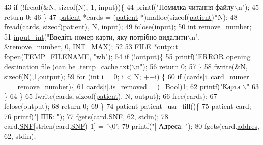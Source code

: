 \begin{DoxyCodeInclude}
{{{43     \textcolor{keywordflow}{if} (!fread(&N, \textcolor{keyword}{sizeof}(N), 1, input))\{
44         printf(\textcolor{stringliteral}{"Помилка читання файлу\(\backslash\)n"});
45         \textcolor{keywordflow}{return} 0;
46     \}
47     \hyperlink{structpatient__struct}{patient} *cards = (\hyperlink{structpatient__struct}{patient} *)malloc(\textcolor{keyword}{sizeof}(\hyperlink{structpatient__struct}{patient})*N);
48     fread(cards, \textcolor{keyword}{sizeof}(\hyperlink{structpatient__struct}{patient}), N, input);
49     fclose(input);
50     \textcolor{keywordtype}{int} remove\_number;
51     \hyperlink{lab__functions_8h_a6f453bc035d85e967bd5032eca31a155}{input\_int}(\textcolor{stringliteral}{"Введіть номер карти, яку потрібно видалити\(\backslash\)n"}, &remove\_number, 0, INT\_MAX);
52 
53     FILE *output = fopen(TEMP\_FILENAME, \textcolor{stringliteral}{"wb"});
54     \textcolor{keywordflow}{if} (!output)\{
55         printf(\textcolor{stringliteral}{"ERROR opening destination file (can be .temp\_cache.txt)\(\backslash\)n"});
56         \textcolor{keywordflow}{return} 0;
57     \}
58     fwrite(&N, \textcolor{keyword}{sizeof}(N),1,output);
59     \textcolor{keywordflow}{for} (\textcolor{keywordtype}{int} i = 0; i < N; ++i) \{
60         \textcolor{keywordflow}{if} (cards[i].\hyperlink{structpatient__struct_a06e0e04046e9434904f4e53bb8583332}{card\_numer} == remove\_number)\{
61             cards[i].\hyperlink{structpatient__struct_ad2475b69abfa9243c2700d63b63aa79b}{is\_removed} = (\_Bool)1;
62             printf(\textcolor{stringliteral}{"Карта \(\backslash\)"%
63         \}
64     \}
65     fwrite(cards, \textcolor{keyword}{sizeof}(\hyperlink{structpatient__struct}{patient}), N, output);
66     free(cards);
67     fclose(output);
68     \textcolor{keywordflow}{return} 0;
69 \}
74 \hyperlink{structpatient__struct}{patient} \hyperlink{main_8c_a582ffa97511f52032c2d36314db2a774}{patient\_usr\_fill}()\{
75     \hyperlink{structpatient__struct}{patient} card;
76     printf(\textcolor{stringliteral}{"|        ПІБ: "});
77     fgets(card.\hyperlink{structpatient__struct_a1748953b20361f0e24b467da0ef4a41c}{SNF}, 62, stdin);
78     card.\hyperlink{structpatient__struct_a1748953b20361f0e24b467da0ef4a41c}{SNF}[strlen(card.\hyperlink{structpatient__struct_a1748953b20361f0e24b467da0ef4a41c}{SNF})-1] = \textcolor{charliteral}{'\(\backslash\)0'};
79     printf(\textcolor{stringliteral}{"|     Адреса: "});
80     fgets(card.\hyperlink{structpatient__struct_a74e029a3ea6a1d9896abb9477f53dcf8}{addres}, 62, stdin);
}}}}
\end{DoxyCodeInclude}
